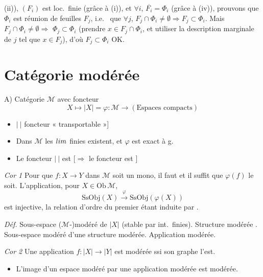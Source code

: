\documentclass[11pt,a4paper]{article}
\begin{document}
(ii)), $(F_i)$ est loc.\ finie (grâce à (i)), et $\forall i$,
$\overline{F_i} = \Phi_i$ (grâce à (iv)), prouvons que $\Phi_i$ est réunion
de feuilles $F_j$, i.e.\  que $\forall j$, $F_j
\cap \Phi_i \neq \emptyset \Rightarrow F_j \subset \Phi_i$. Mais $F_j \cap
\Phi_i \neq \emptyset \Longrightarrow$ \struck{\ill{}} $\Phi_j \subset
\Phi_i$ (prendre $x \in F_j \cap \Phi_i$, et utiliser la description
marginale de $j$ tel que $x \in F_j$), d'où $F_j \subset \Phi_i$ OK.

\section*{Catégorie modérée}

A) Catégorie $\mathcal{M}$ avec foncteur
\[
  X \mapsto |X| = \varphi : \mathcal{M} \longrightarrow (\text{Espaces
  compacts})
\]
\begin{itemize}
  \item[{[M0)}] $|\ |$ foncteur « transportable »]
  \item[M1)] Dans $\mathcal{M}$ les $\varprojlim$ finies existent, et
  $\varphi$ est exact à g.
  \item[M2)] Le foncteur $|\ |$ est  \struck{\ill{}}
  [$\Longrightarrow$ le foncteur est  \struck{\ill{}}]
\end{itemize}

\emph{Cor 1} Pour que $f : X \to Y$ dans $\mathcal{M}$ soit un mono, il faut
et il suffit que $\varphi(f)$ le soit. L'application, pour $X \in
\mathrm{Ob}\,\mathcal{M}$,
\[
  \mathrm{SsObj}(X) \xrightarrow{\ \varphi\ } \mathrm{SsObj}(\varphi(X))
\]
est injective, la relation d'ordre du premier étant induite par
.

\emph{Déf.} Sous-espace ($\mathcal{M}$-)modéré de $|X|$ (stable par int.\
finies). Structure modérée . Sous-espace
modéré d'une structure modérée. Application modérée.

\emph{Cor 2} Une application \struck{\ill{}} $f : |X| \to |Y|$ est modérée
ssi son graphe l'est.
\begin{itemize}
  \item[M3)] L'image d'un espace modéré par une application modérée est
  modérée.
\end{itemize}
\end{document}
